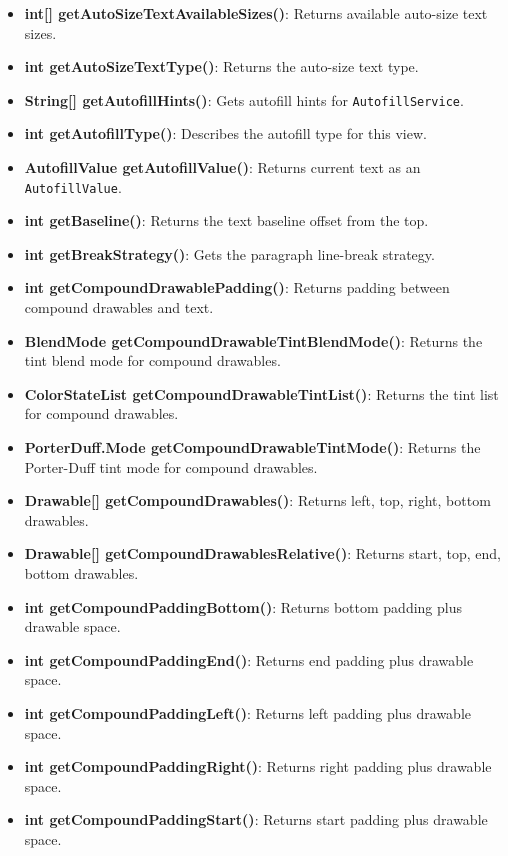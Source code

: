 \documentclass{report}
\begin{document}
\begin{itemize}
\begin{itemize}
                \item \textbf{int[] getAutoSizeTextAvailableSizes()}: Returns available auto-size text sizes.
                \item \textbf{int getAutoSizeTextType()}: Returns the auto-size text type.
                \item \textbf{String[] getAutofillHints()}: Gets autofill hints for \texttt{AutofillService}.
                \item \textbf{int getAutofillType()}: Describes the autofill type for this view.
                \item \textbf{AutofillValue getAutofillValue()}: Returns current text as an \texttt{AutofillValue}.
                \item \textbf{int getBaseline()}: Returns the text baseline offset from the top.
                \item \textbf{int getBreakStrategy()}: Gets the paragraph line-break strategy.
                \item \textbf{int getCompoundDrawablePadding()}: Returns padding between compound drawables and text.
                \item \textbf{BlendMode getCompoundDrawableTintBlendMode()}: Returns the tint blend mode for compound drawables.
                \item \textbf{ColorStateList getCompoundDrawableTintList()}: Returns the tint list for compound drawables.
                \item \textbf{PorterDuff.Mode getCompoundDrawableTintMode()}: Returns the Porter-Duff tint mode for compound drawables.
                \item \textbf{Drawable[] getCompoundDrawables()}: Returns left, top, right, bottom drawables.
                \item \textbf{Drawable[] getCompoundDrawablesRelative()}: Returns start, top, end, bottom drawables.
                \item \textbf{int getCompoundPaddingBottom()}: Returns bottom padding plus drawable space.
                \item \textbf{int getCompoundPaddingEnd()}: Returns end padding plus drawable space.
                \item \textbf{int getCompoundPaddingLeft()}: Returns left padding plus drawable space.
                \item \textbf{int getCompoundPaddingRight()}: Returns right padding plus drawable space.
                \item \textbf{int getCompoundPaddingStart()}: Returns start padding plus drawable space.

\end{itemize}
\end{itemize}
\end{document}
